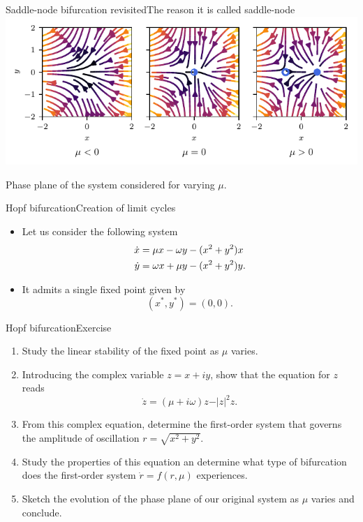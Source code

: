 \documentclass[usenames,dvipsnames,svgnames,10pt,aspectratio=169]{beamer}
\begin{document}
\begin{frame}[t, c]{Saddle-node bifurcation revisited}{The reason it is called saddle-node}
	\centering
	\includegraphics[width=.75\textwidth]{saddle_node_phase_plane}

	Phase plane of the system considered for varying $\mu$.
\end{frame}

\begin{frame}[t, c]{Hopf bifurcation}{Creation of limit cycles}
	\begin{itemize}
		\item Let us consider the following system
		\begin{equation}
			\begin{aligned}
				\dot{x} & = \mu x - \omega y - (x^2 + y^2)x \\
				\dot{y} & = \omega x + \mu y - (x^2 + y^2)y.
			\end{aligned}
			\notag
		\end{equation}

		\medskip

		\item It admits a single fixed point given by
		$$(x^*, y^*) = (0, 0).$$
	\end{itemize}

	\vspace{1cm}
\end{frame}

\begin{frame}[t, c]{Hopf bifurcation}{Exercise}
	\begin{enumerate}
		\item Study the linear stability of the fixed point as $\mu$ varies.
		\item Introducing the complex variable $z = x + iy$, show that the equation for $z$ reads
		$$\dot{z} = (\mu + i\omega)z - \vert z \vert^2z.$$
		\item From this complex equation, determine the first-order system that governs the amplitude of oscillation $r = \sqrt{x^2 + y^2}$.
		\item Study the properties of this equation an determine what type of bifurcation does the first-order system $\dot{r} = f(r, \mu)$ experiences.
		\item Sketch the evolution of the phase plane of our original system as $\mu$ varies and conclude.
	\end{enumerate}

	\vspace{1cm}
\end{frame}
\end{document}
